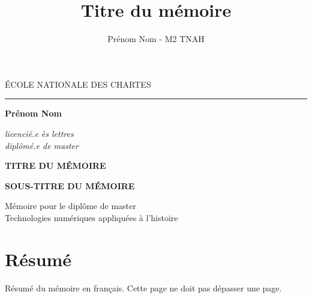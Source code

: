 \documentclass[a4paper,12pt,twoside]{book}
\author{Prénom Nom - M2 TNAH}
\title{Titre du mémoire}
\begin{document}
	\frontmatter
	\begin{titlepage}
		\begin{center}
			
			\bigskip
			
			\begin{large}
				\'ECOLE NATIONALE DES CHARTES
			\end{large}
			\begin{center}\rule{2cm}{0.02cm}\end{center}
			
			\bigskip
			\bigskip
			\bigskip
			\begin{Large}
				\textbf{Prénom Nom}\\
			\end{Large}
			\begin{normalsize} \textit{licencié.e ès lettres}\\
				\textit{diplômé.e de master}
			\end{normalsize}
			
			\bigskip
			\bigskip
			\bigskip
			
			\begin{Huge}
				\textbf{TITRE DU MÉMOIRE}\\
			\end{Huge}
			\bigskip
			\bigskip
			\begin{LARGE}
				\textbf{SOUS-TITRE DU MÉMOIRE}\\
			\end{LARGE}
			
			\bigskip
			\bigskip
			\bigskip
			\begin{large}
			\end{large}
			\vfill
			
			\begin{large}
				Mémoire 
				pour le diplôme de master \\
				\og{} Technologies numériques appliquées à l'histoire \fg{} \\
			\end{large}
			
		\end{center}
	\end{titlepage}
	
	\thispagestyle{empty}	
	\cleardoublepage
	
	\chapter*{Résumé}
	\medskip
	Résumé du mémoire en français. Cette page ne doit pas dépasser une page.\\
	
\end{document}
